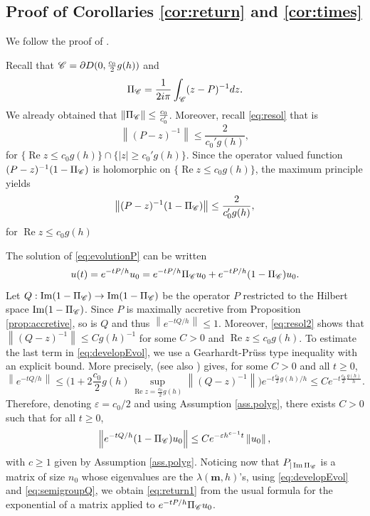 \documentclass[12pt]{amsart}
\renewcommand{\Im}{\operatorname{Im}}
\renewcommand{\Re}{\operatorname{Re}}
\numberwithin{equation}{section}
\numberwithin{figure}{section}
\def\m{\mathbf{m}}
\newcommand{\vvert}[1]{\left\lVert#1\right\rVert}
\begin{document}
\subsection{Proof of Corollaries \ref{cor:return} and \ref{cor:times}}\label{ssec:proofcor}We follow the proof of \cite[Corollaries 1.5 and 1.6]{BoLePMi22}.

Recall that ${\mathscr C} = \partial D(0,\frac{c_0}2g(h))$ and
\begin{equation*}
\Pi_{\mathscr C} = \frac{1}{2i\pi}\int_{{\mathscr C}}(z-P)^{-1}dz.
\end{equation*}
We already obtained that $\vvert{\Pi_\Cr} \leq \frac{c_0}{c_0'}$. Moreover, recall \eqref{eq:resol} that is
\begin{equation*}
\vvert{(P-z)^{-1}}\leq\frac{2}{c_0'g(h)},
\end{equation*}
for $\{\Re z \leq c_0g(h)\}\cap\{|z|\geq c_0'g(h)\}$. Since the operator valued function $(P-z)^{-1}(1-\Pi_{\mathscr C})$ is holomorphic on $\{\Re z \leq c_0g(h)\}$, the maximum principle yields
\begin{equation}\label{eq:resol2}
\vvert{(P-z)^{-1}(1-\Pi_\Cr)}\leq\frac{2}{c_0'g(h)},
\end{equation}
for $\Re z \leq c_0g(h)$

The solution of \eqref{eq:evolutionP} can be written
\begin{equation}\label{eq:developEvol}
u(t) = e^{-tP/h}u_0 = e^{-tP/h}\Pi_{\mathscr C} u_0 + e^{-tP/h}(1-\Pi_{\mathscr C})u_0.
\end{equation}
Let $Q:\Im(1-\Pi_\Cr)\to\Im(1-\Pi_\Cr)$ be the operator $P$ restricted to the Hilbert space $\Im(1-\Pi_\Cr)$. Since $P$ is maximally accretive from Proposition \ref{prop:accretive}, so is $Q$ and thus $\vvert{e^{-tQ/h}}\leq1$. Moreover, \eqref{eq:resol2} shows that $\vvert{(Q-z)^{-1}}\leq Cg(h)^{-1}$ for some $C>0$ and $\Re z \leq c_0g(h)$. To estimate the last term in \eqref{eq:developEvol}, we use a Gearhardt-Pr\"uss type inequality with an explicit bound. More precisely, \cite[Proposition 2.1]{HeSj10_01} (see also \cite{HeSj21_01,HeSjVi24}) gives, for some $C>0$ and all $t\geq0$,
\begin{equation*}
\vvert{e^{-tQ/h}} \leq \Big(1 + 2\frac{c_0}2g(h)\sup_{\Re z = \frac{c_0}2g(h)}\vvert{(Q-z)^{-1}}\Big)e^{-t\frac{c_0}2g(h)/h} \leq Ce^{-t\frac{c_0}2\frac{g(h)}{h}}.
\end{equation*}
Therefore, denoting $\varepsilon = c_0/2$ and using Assumption \ref{ass.polyg}, there exists $C>0$ such that for all $t\geq0$,
\begin{equation}\label{eq:semigroupQ}
\vvert{e^{-tQ/h}(1-\Pi_\Cr)u_0} \leq Ce^{-\varepsilon h^{c-1} t}\vvert{u_0},
\end{equation}
with $c\geq1$ given by Assumption \ref{ass.polyg}. Noticing now that $P_{|\Im\Pi_\Cr}$ is a matrix of size $n_0$ whose eigenvalues are the $\lambda(\m,h)$'s, using \eqref{eq:developEvol} and \eqref{eq:semigroupQ}, we obtain \eqref{eq:return1} from the usual formula for the exponential of a matrix applied to $e^{-tP/h}\Pi_{\mathscr C} u_0$.
\end{document}
